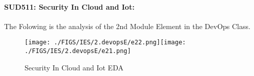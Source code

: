 \documentclass[12pt]{extreport}
\begin{document}

\paragraph{\large SUD511: Security In Cloud and Iot:\\} 
The Folowing is the analysis of the 2nd Module Element in the DevOps Class.
\begin{figure}[H]
	\centering
	\texttt{[image: ./FIGS/IES/2.devopsE/e22.png]}\texttt{[image: ./FIGS/IES/2.devopsE/e21.png]}
	\caption{Security In Cloud and Iot EDA}
	\label{fig:22}
\end{figure}


\begin{comment}


\subparagraph{Interpretation of the Box-plots:\\}
The numbers Below and the boxplots above show that also in this element  TSI students performance is slightly better than PSI students and half of the MP Students. 
\begin{enumerate}	
	\item The MP Class Box-Plot:
	\begin{enumerate}
		\item MAX = 19 {} {} {} {} {} {} {} {} UQ = 18 {} {} {} {} {} {} {} {} Median = 16.5
		\item LQ = 14 {} {} {} {} {} {} {} {}  MIN = 12 {} {} {} {} {} {} {} {}  IQR = 18 - 14 = 4
	\end{enumerate}
	\item The PSI Class Box-Plot:
	\begin{enumerate}
		\item MAX = 16.5 {} {} {} {} {} {} {} {} UQ = 16.25 {} {} {} {} {} {} {} {} Median = 16
		\item LQ = 13.25 {} {} {} {} {} {} {} {}  MIN =	13 {} {} {} {} {} {} {} {} IQR = 16.25 - 13.25 = 3	
	\end{enumerate}
	\item The TSI Class Box-Plot:
	\begin{enumerate}
		\item MAX = 16 {} {} {} {} {} {} {} {} UQ = 15 {} {} {} {} {} {} {} {} Median = 14
		\item LQ = 13.25 {} {} {} {} {} {} {} {} MIN = 12.5 {} {} {} {} {} {} {} {} IQR = 15 - 13.25 = 1.75	
	\end{enumerate}
\end{enumerate}


\subparagraph{Interpretation of the histogram:}
This Frequency Distribution is (Skeness) with the following descriptive statistics:

\begin{enumerate}
	\item Mean = 15.43
	\item STD = 2.1
	\item Range = 18.5 - 12.5 = 6
	\item IQR = 16.5 - 13.5 = 3
\end{enumerate}
\end{comment}
\end{document}
